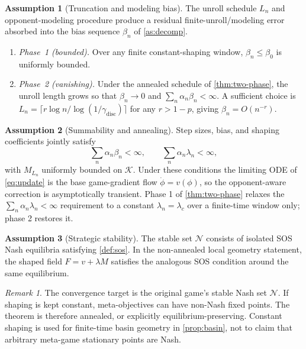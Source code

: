 \documentclass{article}
\theoremstyle{plain}
\theoremstyle{definition}
\newtheorem{assumption}{Assumption}
\theoremstyle{remark}
\newtheorem{remark}[theorem]{Remark}
\newcommand{\K}{\mathcal{K}}
\newcommand{\N}{\mathcal{N}}
\begin{document}
\begin{assumption}[Truncation and modeling bias]\label{as:trunc}
The unroll schedule $L_n$ and opponent-modeling procedure produce a residual finite-unroll/modeling error absorbed into the bias sequence $\beta_n$ of \cref{as:decomp}.
\begin{enumerate}[label=(\alph*),leftmargin=1.3em]
\item \emph{Phase~1 (bounded).} Over any finite constant-shaping window, $\beta_n\le\beta_0$ is uniformly bounded.
\item \emph{Phase~2 (vanishing).} Under the annealed schedule of \cref{thm:two-phase}, the unroll length grows so that $\beta_n\to0$ and $\sum_n\alpha_n\beta_n<\infty$. A sufficient choice is $L_n=\lceil r\log n/\log(1/\gamma_{\mathrm{disc}})\rceil$ for any $r>1-p$, giving $\beta_n=O(n^{-r})$.
\end{enumerate}
\end{assumption}

\begin{assumption}[Summability and annealing]\label{as:anneal}
Step sizes, bias, and shaping coefficients jointly satisfy
\[
\sum_n\alpha_n\beta_n<\infty,\qquad
\sum_n\alpha_n\lambda_n<\infty,
\]
with $M_{L_n}$ uniformly bounded on $\K$. Under these conditions the limiting ODE of \eqref{eq:update} is the base game-gradient flow $\dot\phi=v(\phi)$, so the opponent-aware correction is asymptotically transient. Phase 1 of \cref{thm:two-phase} relaxes the $\sum_n\alpha_n\lambda_n<\infty$ requirement to a constant $\lambda_n=\lambda_c$ over a finite-time window only; phase 2 restores it.
\end{assumption}

\begin{assumption}[Strategic stability]\label{as:stable}
The stable set $\N$ consists of isolated SOS Nash equilibria satisfying \cref{def:sos}. In the non-annealed local geometry statement, the shaped field $F=v+\lambda M$ satisfies the analogous SOS condition around the same equilibrium.
\end{assumption}

\begin{remark}
The convergence target is the original game's stable Nash set $\N$. If shaping is kept constant, meta-objectives can have non-Nash fixed points. The theorem is therefore annealed, or explicitly equilibrium-preserving. Constant shaping is used for finite-time basin geometry in \cref{prop:basin}, not to claim that arbitrary meta-game stationary points are Nash.
\end{remark}
\end{document}
